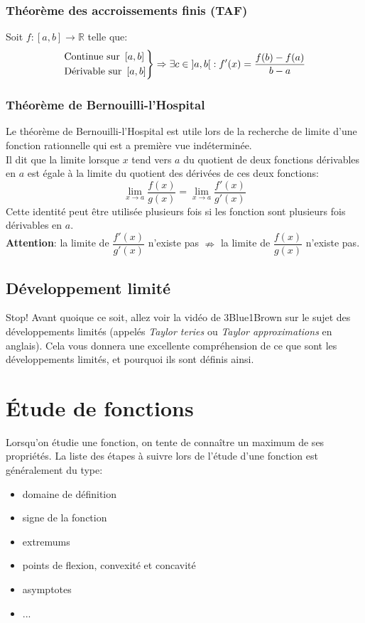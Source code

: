 \documentclass{article}
\numberwithin{equation}{section}
\begin{document}
\subsubsection{Théorème des accroissements finis (TAF)}
Soit \(f : \left [a, b \right ] \to \mathbb{R}\) telle que:
\begin{equation*}
	\begin{rcases}
		\text{Continue sur } \left [a, b \right ] \\
		\text{Dérivable sur } \left [a, b \right ] 
	\end{rcases}
	\Rightarrow \exists c \in \left ]a, b \right [ : f'(x) = \frac{f(b) - f(a)}{b - a}
\end{equation*}


\subsubsection{Théorème de Bernouilli-l'Hospital}
Le théorème de Bernouilli-l'Hospital est utile lors de la recherche de limite d'une fonction rationnelle qui est a première vue indéterminée. \\

Il dit que la limite lorsque \(x\) tend vers \(a\) du quotient de deux fonctions dérivables en \(a\) est égale à la limite du quotient des dérivées de ces deux fonctions:
\begin{equation*}
	\lim_{x \to a} \dfrac{f(x)}{g(x)} = \lim_{x \to a} \dfrac{f'(x)}{g'(x)}
\end{equation*}
Cette identité peut être utilisée plusieurs fois si les fonction sont plusieurs fois dérivables en \(a\). \\

\textbf{Attention}: la limite de \(\dfrac{f'(x)}{g'(x)}\) n'existe pas \(\nRightarrow\) la limite de \(\dfrac{f(x)}{g(x)}\) n'existe pas.

\subsection{Développement limité}
Stop! Avant quoique ce soit, allez voir la vidéo de 3Blue1Brown sur le sujet des développements limités (appelés \emph{Taylor teries} ou \emph{Taylor approximations} en anglais). Cela vous donnera une excellente compréhension de ce que sont les développements limités, et pourquoi ils sont définis ainsi. %

\section{Étude de fonctions}
Lorsqu'on étudie une fonction, on tente de connaître un maximum de ses propriétés. La liste des étapes à suivre lors de l'étude d'une fonction est généralement du type:
\begin{itemize}
	\item domaine de définition
	\item signe de la fonction
	\item extremums
	\item points de flexion, convexité et concavité
	\item asymptotes
	\item ... %
\end{itemize}
\end{document}
